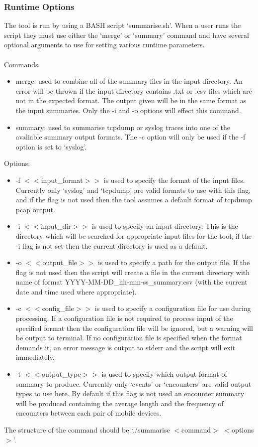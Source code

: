 \subsubsection{Runtime Options}
The tool is run by using a BASH script `summarise.sh'. When a user runs the script they must use either the `merge' or `summary' command and have several optional arguments to use for setting various runtime parameters. 
\\\\
Commands:
\begin{itemize}
    \item merge: used to combine all of the summary files in the input directory. An error will be thrown if the input directory contains .txt or .csv files which are not in the expected format. The output given will be in the same format as the input summaries. Only the -i and -o options will effect this command.
    \item summary: used to summarise tcpdump or syslog traces into one of the avaliable summary output formats. The -c option will only be used if the -f option is set to `syslog'.
\end{itemize}
Options:
\begin{itemize}
    \item -f $<<$input\_format$>>$ is used to specify the format of the input files. Currently only `syslog' and `tcpdump' are valid formats to use with this flag, and if the flag is not used then the tool assumes a default format of tcpdump pcap output.
    \item -i $<<$input\_dir$>>$ is used to specify an input directory. This is the directory which will be searched for appropriate input files for the tool, if the -i flag is not set then the current directory is used as a default.
    \item -o $<<$output\_file$>>$ is used to specify a path for the output file. If the flag is not used then the script will create a file in the current directory with name of format YYYY-MM-DD\_hh-mm-ss\_summary.csv (with the current date and time used where appropriate).
    \item -c $<<$config\_file$>>$ is used to specify a configuration file for use during processing. If a configuration file is not required to process input of the specified format then the configuration file will be ignored, but a warning will be output to terminal. If no configuration file is specified when the format demands it, an error message is output to stderr and the script will exit immediately.
    \item -t $<<$output\_type$>>$ is used to specify which output format of summary to produce. Currently only `events' or `encounters' are valid output types to use here. By default if this flag is not used an encounter summary will be produced containing the average length and the frequency of encounters between each pair of mobile devices.
\end{itemize}
The structure of the command should be `./summarise $<$command$>$ $<$options$>$'.